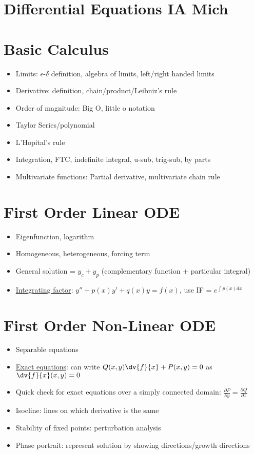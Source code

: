 



\section*{Differential Equations \hfill IA Mich}
\section{Basic Calculus}
\begin{itemize}
    \item Limits: $\epsilon$-$\delta$ definition,
          algebra of limits, left/right handed limits
    \item Derivative: definition, chain/product/Leibniz's rule
    \item Order of magnitude: Big O, little o notation
    \item Taylor Series/polynomial
    \item L'Hopital's rule
    \item Integration, FTC, indefinite integral, u-sub, trig-sub, by parts
    \item Multivariate functions: Partial derivative, multivariate chain rule
\end{itemize}

\section{First Order Linear ODE}
\begin{itemize}
    \item Eigenfunction, logarithm
    \item Homogeneous, heterogeneous, forcing term
    \item General solution = $y_c + y_p$ (complementary function + particular integral)
    \item \underline{Integrating factor}: $y'' + p(x)y' + q(x)y=f(x)$, use IF = $e^{\int{p(x)dx}}$
\end{itemize}

\section{First Order Non-Linear ODE}
\begin{itemize}
    \item Separable equations
    \item \underline{Exact equations}: can write $Q(x,y)\dv{f}{x} + P(x,y) =0$ as $\dv{f}{x}(x,y)=0$
    \item Quick check for exact equations over a simply connected domain: $\frac{\partial P}{\partial y} = \frac{\partial Q}{\partial x}$
    \item Isocline: lines on which derivative is the same
    \item Stability of fixed points: perturbation analysis
    \item Phase portrait: represent solution by showing directions/growth directions
\end{itemize}

